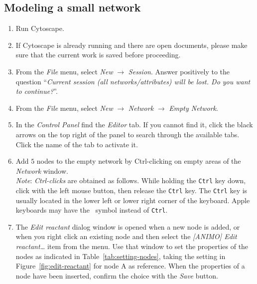 \subsection{Modeling a small network}\label{sec:modeling-network-example}
\begin{enumerate}
\item Run Cytoscape.
\item If Cytoscape is already running and there are open documents, please make sure that the current work is saved before proceeding.
\item From the \emph{File} menu, select \emph{New} $\rightarrow$ \emph{Session}. Answer positively to the question
``\emph{Current session (all networks/attributes) will be lost. Do you want to continue?}''.
\item From the \emph{File} menu, select \emph{New} $\rightarrow$ \emph{Network} $\rightarrow$ \emph{Empty Network}.
\item In the \emph{Control Panel} find the \emph{Editor} tab. If you cannot find it,
click the black arrows on the top right of the panel to search through the available tabs. Click the name of the tab to activate it.
\item\label{step:add-nodes} Add $5$ nodes to the empty network by Ctrl-clicking
on empty areas of the \emph{Network} window.\\
\emph{Note}: \emph{Ctrl-clicks} are obtained as follows. While
holding the {\tt Ctrl} key down, click with the left mouse button, then release the {\tt Ctrl} key.
The {\tt Ctrl} key is usually located in the lower left or lower right corner of the keyboard. Apple keyboards
may have the \maccmd\ symbol instead of {\tt Ctrl}.
\item The \emph{Edit reactant} dialog window is opened when a new node is added,
or when you right click an existing node and then select the \emph{[ANIMO] Edit reactant\dots}
item from the menu. Use that window to set the properties of the nodes as indicated in Table~\ref{tab:setting-nodes},
taking the setting in Figure~\ref{fig:edit-reactant} for node A as reference. When
the properties of a node have been inserted, confirm the choice with the \emph{Save} button.
\setcounter{miocounterperenumerate}{\value{enumi}}
\end{enumerate}\vspace{-2ex}

